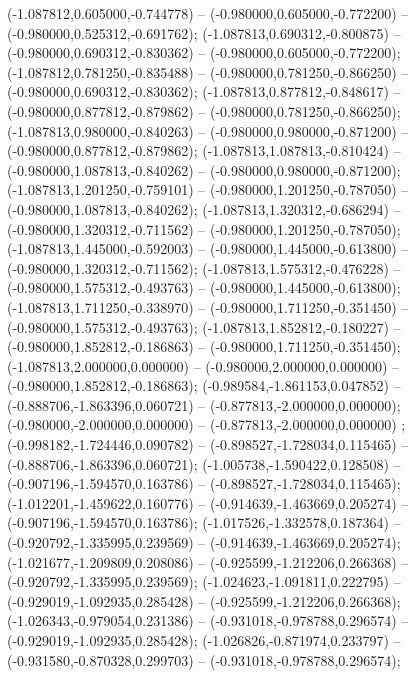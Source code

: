  (-1.087812,0.605000,-0.744778) -- (-0.980000,0.605000,-0.772200) -- (-0.980000,0.525312,-0.691762);
 (-1.087813,0.690312,-0.800875) -- (-0.980000,0.690312,-0.830362) -- (-0.980000,0.605000,-0.772200);
 (-1.087812,0.781250,-0.835488) -- (-0.980000,0.781250,-0.866250) -- (-0.980000,0.690312,-0.830362);
 (-1.087813,0.877812,-0.848617) -- (-0.980000,0.877812,-0.879862) -- (-0.980000,0.781250,-0.866250);
 (-1.087813,0.980000,-0.840263) -- (-0.980000,0.980000,-0.871200) -- (-0.980000,0.877812,-0.879862);
 (-1.087813,1.087813,-0.810424) -- (-0.980000,1.087813,-0.840262) -- (-0.980000,0.980000,-0.871200);
 (-1.087813,1.201250,-0.759101) -- (-0.980000,1.201250,-0.787050) -- (-0.980000,1.087813,-0.840262);
 (-1.087813,1.320312,-0.686294) -- (-0.980000,1.320312,-0.711562) -- (-0.980000,1.201250,-0.787050);
 (-1.087813,1.445000,-0.592003) -- (-0.980000,1.445000,-0.613800) -- (-0.980000,1.320312,-0.711562);
 (-1.087813,1.575312,-0.476228) -- (-0.980000,1.575312,-0.493763) -- (-0.980000,1.445000,-0.613800);
 (-1.087813,1.711250,-0.338970) -- (-0.980000,1.711250,-0.351450) -- (-0.980000,1.575312,-0.493763);
 (-1.087813,1.852812,-0.180227) -- (-0.980000,1.852812,-0.186863) -- (-0.980000,1.711250,-0.351450);
 (-1.087813,2.000000,0.000000) -- (-0.980000,2.000000,0.000000) -- (-0.980000,1.852812,-0.186863);
 (-0.989584,-1.861153,0.047852) -- (-0.888706,-1.863396,0.060721) -- (-0.877813,-2.000000,0.000000);
 (-0.980000,-2.000000,0.000000) -- (-0.877813,-2.000000,0.000000) ;
 (-0.998182,-1.724446,0.090782) -- (-0.898527,-1.728034,0.115465) -- (-0.888706,-1.863396,0.060721);
 (-1.005738,-1.590422,0.128508) -- (-0.907196,-1.594570,0.163786) -- (-0.898527,-1.728034,0.115465);
 (-1.012201,-1.459622,0.160776) -- (-0.914639,-1.463669,0.205274) -- (-0.907196,-1.594570,0.163786);
 (-1.017526,-1.332578,0.187364) -- (-0.920792,-1.335995,0.239569) -- (-0.914639,-1.463669,0.205274);
 (-1.021677,-1.209809,0.208086) -- (-0.925599,-1.212206,0.266368) -- (-0.920792,-1.335995,0.239569);
 (-1.024623,-1.091811,0.222795) -- (-0.929019,-1.092935,0.285428) -- (-0.925599,-1.212206,0.266368);
 (-1.026343,-0.979054,0.231386) -- (-0.931018,-0.978788,0.296574) -- (-0.929019,-1.092935,0.285428);
 (-1.026826,-0.871974,0.233797) -- (-0.931580,-0.870328,0.299703) -- (-0.931018,-0.978788,0.296574);
